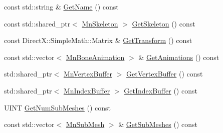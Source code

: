 \begin{DoxyCompactItemize}
\item 
const std\+::string \& \hyperlink{class_m_n_l_1_1_mn_mesh_data_a3c08b6786c10601909da1cd2da7eb2dd}{Get\+Name} () const
\item 
const std\+::shared\+\_\+ptr$<$ \hyperlink{class_m_n_l_1_1_mn_skeleton}{Mn\+Skeleton} $>$ \hyperlink{class_m_n_l_1_1_mn_mesh_data_adc90604cc77bbdde83e0a539822db40e}{Get\+Skeleton} () const
\item 
const Direct\+X\+::\+Simple\+Math\+::\+Matrix \& \hyperlink{class_m_n_l_1_1_mn_mesh_data_a14d9a6fd189c2c9b0f5c34b3a1aa7ec9}{Get\+Transform} () const
\item 
const std\+::vector$<$ \hyperlink{class_m_n_l_1_1_mn_bone_animation}{Mn\+Bone\+Animation} $>$ \& \hyperlink{class_m_n_l_1_1_mn_mesh_data_a70cb805cb3b13731dd05adaf7730ef83}{Get\+Animations} () const
\item 
std\+::shared\+\_\+ptr$<$ \hyperlink{class_m_n_l_1_1_mn_vertex_buffer}{Mn\+Vertex\+Buffer} $>$ \hyperlink{class_m_n_l_1_1_mn_mesh_data_a63f8b56714a35f4c1dc1a09dc8f936a1}{Get\+Vertex\+Buffer} () const
\item 
std\+::shared\+\_\+ptr$<$ \hyperlink{class_m_n_l_1_1_mn_index_buffer}{Mn\+Index\+Buffer} $>$ \hyperlink{class_m_n_l_1_1_mn_mesh_data_a0d78bd03e4887e4a728f425b099ad1cf}{Get\+Index\+Buffer} () const
\item 
U\+I\+NT \hyperlink{class_m_n_l_1_1_mn_mesh_data_a324ba83139ce03f30f59b616fbd2235a}{Get\+Num\+Sub\+Meshes} () const
\item 
const std\+::vector$<$ \hyperlink{struct_m_n_l_1_1_mn_sub_mesh}{Mn\+Sub\+Mesh} $>$ \& \hyperlink{class_m_n_l_1_1_mn_mesh_data_a15ddb3594a7ead8f11f788a45d00ce59}{Get\+Sub\+Meshes} () const
\end{DoxyCompactItemize}
